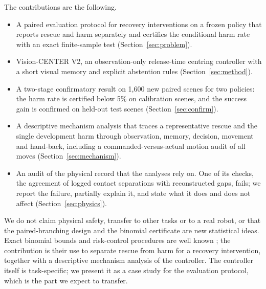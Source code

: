 The contributions are the following.
\begin{itemize}
\item A paired evaluation protocol for recovery interventions on a frozen policy that reports rescue and harm separately and certifies the conditional harm rate with an exact finite-sample test (Section~\ref{sec:problem}).
\item Vision-CENTER V2, an observation-only release-time centring controller with a short visual memory and explicit abstention rules (Section~\ref{sec:method}).
\item A two-stage confirmatory result on 1,600 new paired scenes for two policies: the harm rate is certified below 5\% on calibration scenes, and the success gain is confirmed on held-out test scenes (Section~\ref{sec:confirm}).
\item A descriptive mechanism analysis that traces a representative rescue and the single development harm through observation, memory, decision, movement and hand-back, including a commanded-versus-actual motion audit of all moves (Section~\ref{sec:mechanism}).
\item An audit of the physical record that the analyses rely on. One of its checks, the agreement of logged contact separations with reconstructed gaps, fails; we report the failure, partially explain it, and state what it does and does not affect (Section~\ref{sec:physics}).
\end{itemize}

We do not claim physical safety, transfer to other tasks or to a real robot, or that the paired-branching design and the binomial certificate are new statistical ideas. Exact binomial bounds and risk-control procedures are well known \cite{clopper1934,angelopoulos2021ltt}; the contribution is their use to separate rescue from harm for a recovery intervention, together with a descriptive mechanism analysis of the controller. The controller itself is task-specific; we present it as a case study for the evaluation protocol, which is the part we expect to transfer.

